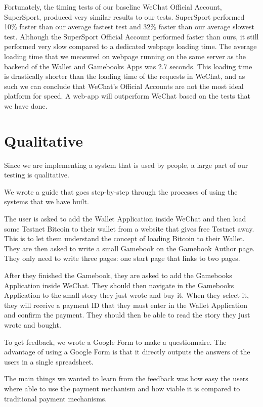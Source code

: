 Fortunately, the timing tests of our baseline WeChat Official Account, SuperSport, produced very similar results to our tests. SuperSport performed 10\% faster than our average fastest test and 32\% faster than our average slowest test. Although the SuperSport Official Account performed faster than ours, it still performed very slow compared to a dedicated webpage loading time. The average loading time that we measured on webpage running on the same server as the backend of the Wallet and Gamebooks Apps was 2.7 seconds. This loading time is drastically shorter than the loading time of the requests in WeChat, and as such we can conclude that WeChat's Official Accounts are not the most ideal platform for speed. A web-app will outperform WeChat based on the tests that we have done. 

	
\section{Qualitative}

Since we are implementing a system that is used by people, a large part of our testing is qualitative.

We wrote a guide that goes step-by-step through the processes of using the systems that we have built.

The user is asked to add the Wallet Application inside WeChat and then load some Testnet Bitcoin to their wallet from a website that gives free Testnet away. This is to let them understand the concept of loading Bitcoin to their Wallet. They are then asked to write a small Gamebook on the Gamebook Author page. They only need to write three pages: one start page that links to two pages.

After they finished the Gamebook, they are asked to add the Gamebooks Application inside WeChat. They should then navigate in the Gamebooks Application to the small story they just wrote and buy it. When they select it, they will receive a payment ID that they must enter in the Wallet Application and confirm the payment. They should then be able to read the story they just wrote and bought.

To get feedback, we wrote a Google Form to make a questionnaire. The advantage of using a Google Form is that it directly outputs the answers of the users in a single spreadsheet.

The main things we wanted to learn from the feedback was how easy the users where able to use the payment mechanism and how viable it is compared to traditional payment mechanisms.

